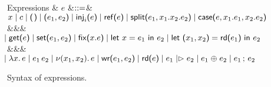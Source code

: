 \begin{figure*}
  \begin{grammar}
    Expressions
    & $e$
        &$\bnfas$&
        $\eVar{x} \bnfalt \eChan{c} \bnfalt \eUnit \bnfalt \ePair{e_1}{e_2}
    \bnfalt \eInj{i}{e} \bnfalt \eRef{e} \bnfalt \eSplit{e_1}{x_1}{x_2}{e_2}
    \bnfalt \eCase{e}{x_1}{e_1}{x_2}{e_2}$
    \\ &&& $\bnfaltbrk \eGet{e} \bnfalt \eSet{e_1}{e_2} \bnfalt \eFix{x}{e} \bnfalt
    \eLet{x}{e_1}{e_2} \bnfalt \eLetRd{x_1}{x_2}{e_1}{e_2}$
    \\ &&& $\bnfaltbrk \eLam{x}{e} \bnfalt \eApp{e_1}{e_2} \bnfalt \eNu{(x_1,
      x_2)}{e} \bnfalt \eWr{e_1}{e_2} \bnfalt \eRd{e} \bnfalt \eFork{e_1}{e_2}
    \bnfalt \eChoice{e_1}{e_2} \bnfalt \eSeq{e_1}{e_2}$
  \end{grammar}
  \caption{Syntax of expressions.}
  \label{fig:ilc-syntax}
\end{figure*}
